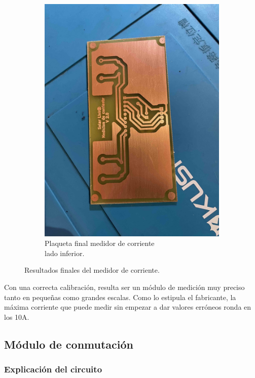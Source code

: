 \begin{figure}[H]
\begin{subfigure}{0.5\textwidth}
\includegraphics[width=0.9\linewidth]{hardware/IMG_8587.jpg}
\caption{Plaqueta final medidor de corriente \\lado inferior.}
\label{fig:corr-pcb}
\end{subfigure}

\caption{Resultados finales del medidor de corriente.}
\label{fig:corriente-fin}
\end{figure}

Con una correcta calibración, resulta ser un módulo de medición muy preciso tanto en pequeñas como grandes escalas. Como lo estipula el fabricante, la máxima corriente que puede medir sin empezar a dar valores erróneos ronda en los 10A.

\clearpage

\subsection{Módulo de conmutación}

\subsubsection{Explicación del circuito}


